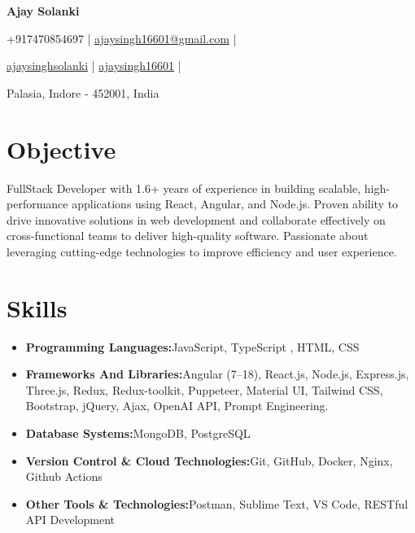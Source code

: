 \documentclass[a4paper,11pt]{article}
\newcommand{\resumeItem}[2]{
  \item{
    \textbf{#1}{\hspace{0.5mm}#2 \vspace{-0.5mm}}
  }
}
\newcommand{\resumeSubItem}[2]{\resumeItem{#1}{#2}\vspace{-4pt}}
\newcommand{\resumeHeadingSkillStart}{\begin{itemize}[leftmargin=*,itemsep=1.7mm, rightmargin=2ex]}
\newcommand{\resumeHeadingSkillEnd}{\end{itemize}\vspace{-2mm}}
\newcommand{\socialicon}[1]{\raisebox{-0.05em}{\resizebox{!}{1em}{#1}}}
\newcommand{\headerfontiii}{\fontfamily{ppl}\selectfont} %
\begin{document}
\headerfontiii

\begin{center}
    {\Huge\textbf{Ajay Solanki}}
\end{center}
\vspace{-5mm}

\begin{center}
    \small{
    +917470854697 | \href{mailto:ajaysingh16601@gmail.com}{ajaysingh16601@gmail.com} |
    }
\end{center}
\vspace{-5.5mm}

\begin{center}
    \small{
    \socialicon{\faLinkedin} \href{https://www.linkedin.com/in/ajaysinghsolanki/}{ajaysinghsolanki} | 
    \socialicon{\faGithub} \href{https://github.com/ajaysingh16601}{ajaysingh16601} | 
    }
\end{center}
\vspace{-5.5mm}
\begin{center}
    \small{Palasia, Indore - 452001, India}
\end{center}

\vspace{-4mm}

\section{\textbf{Objective}}
\vspace{1mm}
\small{
  FullStack Developer with 1.6+ years of experience in building scalable, high-performance applications using React, Angular, and Node.js. Proven ability to drive innovative solutions in web development and collaborate effectively on cross-functional teams to deliver high-quality software. Passionate about leveraging cutting-edge technologies to improve efficiency and user experience. 
}
\vspace{-2mm}


\section{\textbf{Skills}}
\vspace{-0.2mm}
  \resumeHeadingSkillStart
    \resumeSubItem{Programming Languages:}
      {JavaScript, TypeScript , HTML, CSS}
    \resumeSubItem{Frameworks And Libraries:}
      {Angular (7–18), React.js, Node.js, Express.js, Three.js, Redux, Redux-toolkit, Puppeteer, Material UI, Tailwind CSS, Bootstrap, jQuery, Ajax, OpenAI API, Prompt Engineering.}
    \resumeSubItem{Database Systems:}
      {MongoDB, PostgreSQL}
    \resumeSubItem{Version Control \& Cloud Technologies:}
      {Git, GitHub, Docker, Nginx, Github Actions}
    \resumeSubItem{Other Tools \& Technologies:}
      {Postman, Sublime Text, VS Code, RESTful API Development }
  \resumeHeadingSkillEnd
\end{document}
